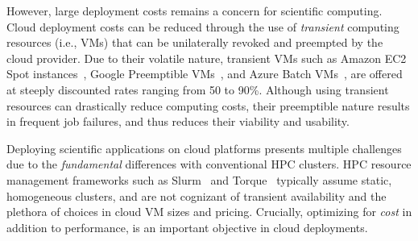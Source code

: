 However, large deployment costs remains a concern for scientific computing. 
Cloud deployment costs can be reduced through the use of \emph{transient} computing resources (i.e., VMs) that can be unilaterally revoked and preempted by the cloud provider.
Due to their volatile nature, transient VMs such as Amazon EC2 Spot instances~\cite{spot-documentation}, Google Preemptible VMs~\cite{preemptible-documentation}, and Azure Batch VMs~\cite{azure-batch}, are offered at steeply discounted rates ranging from 50 to 90\%. 
Although using transient resources can drastically reduce computing costs, their preemptible nature results in frequent job failures, and thus reduces their viability and usability. 


Deploying scientific applications on cloud platforms presents multiple challenges due to the \emph{fundamental} differences with conventional HPC clusters.
HPC resource management frameworks such as Slurm~\cite{slurm} and Torque~\cite{torque} typically assume static, homogeneous clusters, and are not cognizant of transient availability and the plethora of choices in cloud VM sizes and pricing. %
Crucially, optimizing for \emph{cost} in addition to performance, is an important 
 objective in cloud deployments. 

%







